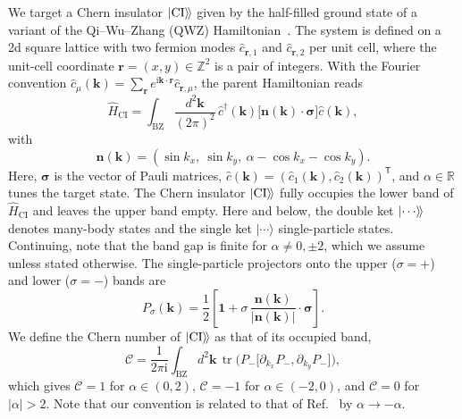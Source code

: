 \documentclass[aps,prb,twocolumn,superscriptaddress,longbibliography,floatfix]{revtex4-2}
\newcommand{\ii}{\mathrm{i}}
\newcommand{\mc}[1]{\mathcal{#1}}
\newcommand{\mr}[1]{\mathrm{#1}}
\newcommand{\Id}{\mathbf{1}}
\newcommand{\bfr}{\boldsymbol r}
\newcommand{\bk}{\boldsymbol k}
\newcommand{\kett}[1]{\ket{#1}\!\rangle}
\newcommand{\CI}{\kett{\mr{CI}}}
\begin{document}
We target a Chern insulator $\CI$ given by the half-filled ground state of a variant of the Qi--Wu--Zhang (QWZ) Hamiltonian~\cite{QiWuZhang2006}. The system is defined on a 2d square lattice with two fermion modes $\hat c_{\bfr,1}$ and $\hat c_{\bfr,2}$ per unit cell, where the unit-cell coordinate $\bfr=(x,y)\in\mathbb Z^2$ is a pair of integers. With the Fourier convention $\hat c_\mu(\bk)=\sum_{\bfr}e^{\ii\bk\cdot\bfr}\hat c_{\bfr,\mu}$, the parent Hamiltonian reads
\begin{equation}
    \hat H_{\mr{CI}}=\int_{\mr{BZ}}\frac{d^2\bk}{(2\pi)^2}\,
    \hat c^\dagger(\bk)\big[\boldsymbol n(\bk)\cdot\boldsymbol\sigma\big]\hat c(\bk),
    \label{eq:QWZ}
\end{equation}
with
\begin{equation}
    \boldsymbol n(\bk)=(\sin k_x,\ \sin k_y,\ \alpha-\cos k_x-\cos k_y).
    \label{eq:SpectralVector}
\end{equation}
Here, $\boldsymbol\sigma$ is the vector of Pauli matrices, $\hat c(\bk)=(\hat c_1(\bk),\hat c_2(\bk))^{\mathsf T}$, and $\alpha\in\mathbb R$ tunes the target state. The Chern insulator $\CI$ fully occupies the lower band of $\hat H_{\mr{CI}}$ and leaves the upper band empty.  Here and below, the double ket $\kett{\cdots}$ denotes many-body states and the single ket $|\cdots\rangle$ single-particle states. Continuing, note that the band gap is finite for $\alpha\neq0,\pm2$, which we assume unless stated otherwise. The single-particle projectors onto the upper ($\sigma=+$) and lower ($\sigma=-$) bands are
\begin{equation}
    P_\sigma(\bk)=\frac12\left[\Id+\sigma\,\frac{\boldsymbol n(\bk)}{|\boldsymbol n(\bk)|}\cdot\boldsymbol\sigma\right].
    \label{eq:BandProjectors}
\end{equation}
We define the Chern number of $\CI$ as that of its occupied band,
\begin{equation}
    \mc C=\frac{1}{2\pi\ii}\int_{\mr{BZ}}d^2\bk\,
    \operatorname{tr}\!\Big(P_-\big[\partial_{k_x}P_-,\partial_{k_y}P_-\big]\Big),
    \label{eq:ChernNumber}
\end{equation}
which gives $\mc C=1$ for $\alpha\in(0,2)$, $\mc C=-1$ for $\alpha\in(-2,0)$, and $\mc C=0$ for $|\alpha|>2$. Note that our convention is related to that of Ref.~\cite{BhuiyanPanJian2026} by $\alpha\to-\alpha$.
\end{document}
